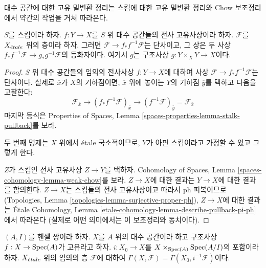 \noindent
대수 공간에 대한 고유 밑변환 정리는 스킴에 대한 고유 밑변환 정리와
Chow 보조정리에서 약간의 작업을 거쳐 따라온다.

\begin{lemma}
\label{lemma-surjective-proper}
$S$를 스킴이라 하자. $f : Y \to X$를 $S$ 위 대수 공간들의
전사 고유사상이라 하자. $\mathcal{F}$를 $X_{\acute{e}tale}$ 위의 층이라 하자.
그러면 $\mathcal{F} \to f_*f^{-1}\mathcal{F}$는 단사이고,
그 상은 두 사상
$f_*f^{-1}\mathcal{F} \to g_*g^{-1}\mathcal{F}$의 등화자이다.
여기서 $g$는 구조사상 $g : Y \times_X Y \to X$이다.
\end{lemma}

\begin{proof}
$S$ 위 대수 공간들의 임의의 전사사상 $f : Y \to X$에 대하여
사상 $\mathcal{F} \to f_*f^{-1}\mathcal{F}$는 단사이다.
실제로 $\overline{x}$가 $X$의 기하점이면, $\overline{x}$ 위에 놓이는
$Y$의 기하점 $\overline{y}$를 택하고 다음을 고찰한다:
$$
\mathcal{F}_{\overline{x}} \to
(f_*f^{-1}\mathcal{F})_{\overline{x}} \to
(f^{-1}\mathcal{F})_{\overline{y}} = \mathcal{F}_{\overline{x}}
$$
마지막 등식은 Properties of Spaces, Lemma
\ref{spaces-properties-lemma-stalk-pullback}를 보라.

\medskip\noindent
두 번째 명제는 $X$ 위에서 \'etale 국소적이므로,
$Y$가 아핀 스킴이라고 가정할 수 있고 그렇게 한다.

\medskip\noindent
$Z$가 스킴인 전사 고유사상 $Z \to Y$를 택하자.
Cohomology of Spaces, Lemma
\ref{spaces-cohomology-lemma-weak-chow}를 보라.
$Z \to X$에 대한 결과는 $Y \to X$에 대한 결과를 함의한다.
$Z \to X$는 스킴들의 전사 고유사상이고 따라서 ph 피복이므로
(Topologies, Lemma \ref{topologies-lemma-surjective-proper-ph}),
$Z \to X$에 대한 결과는 \'Etale Cohomology, Lemma
\ref{etale-cohomology-lemma-describe-pullback-pi-ph}에서 따라온다
(실제로 어떤 의미에서는 이 보조정리와 동치이다).
\end{proof}

\begin{lemma}
\label{lemma-h0-proper-over-henselian-pair}
$(A, I)$를 헨젤 쌍이라 하자. $X$를 $A$ 위의 대수 공간이라 하고
구조사상 $f : X \to \mathop{\mathrm{Spec}}(A)$가 고유라고 하자.
$i : X_0 \to X$를 $X \times_{\mathop{\mathrm{Spec}}(A)} \mathop{\mathrm{Spec}}(A/I)$의 포함이라 하자.
$X_{\acute{e}tale}$ 위의 임의의 층 $\mathcal{F}$에 대하여
$\Gamma(X, \mathcal{F}) = \Gamma(X_0, i^{-1}\mathcal{F})$이다.
\end{lemma}

